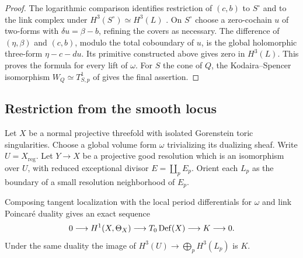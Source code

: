 \begin{proof}
The logarithmic comparison identifies restriction of $(c,b)$ to
$S^\circ$ and to the link complex under $H^3(S^\circ)\simeq H^3(L)$
\cite[\S1.1]{FL}. On $S^\circ$ choose a zero-cochain $u$ of
two-forms with $\delta u=\beta-b$, refining the covers as necessary.
The difference of $(\eta,\beta)$ and $(c,b)$, modulo the total
coboundary of $u$, is the global holomorphic three-form
$\eta-c-du$. Its primitive constructed above gives zero in $H^3(L)$.
This proves the formula for every lift of $\omega$. For $S$ the cone
of $Q$, the Kodaira--Spencer isomorphism $W_Q\simeq T^1_{S,p}$
of \cite[\S6.2 and the corollary in \S7.2]{Alt} gives the final assertion.
\end{proof}

\subsection{Restriction from the smooth locus}
Let $X$ be a normal projective threefold with isolated Gorenstein toric
singularities. Choose a global volume form $\omega$ trivializing its
dualizing sheaf. Write
$U=X_{\mathrm{reg}}$. Let $Y\to X$ be a projective good resolution
which is an isomorphism over $U$, with reduced exceptional divisor
$E=\coprod_p E_p$. Orient each $L_p$ as the boundary of a small
resolution neighborhood of $E_p$.

\begin{proposition}\label{prop:tangent}
Composing tangent localization with the local period differentials for
$\omega$ and link Poincar\'e duality gives an exact sequence
\[
 0\longrightarrow H^1(X,\Theta_X)
 \longrightarrow T_0\operatorname{Def}(X)
 \longrightarrow K\longrightarrow 0 .
\]
Under the same duality the image of
$H^3(U)\to\bigoplus_p H^3(L_p)$ is $K$.
\end{proposition}


